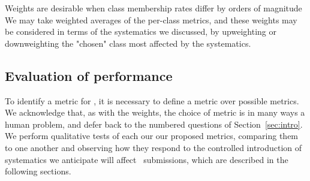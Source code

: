 
Weights are desirable when class membership rates differ by orders of magnitude
We may take weighted averages of the per-class metrics, and these weights may be considered in terms of the systematics we discussed, by upweighting or downweighting the "chosen" class most affected by the systematics.

\subsection{Evaluation of performance}
\label{sec:inception}

To identify a metric for \plasticc, it is necessary to define a metric over possible metrics.
We acknowledge that, as with the weights, the choice of metric is in many ways a human problem, and defer back to the numbered questions of Section~\ref{sec:intro}.
We perform qualitative tests of each our our proposed metrics, comparing them to one another and observing how they respond to the controlled introduction of systematics we anticipate will affect \plasticc\ submissions, which are described in the following sections.
